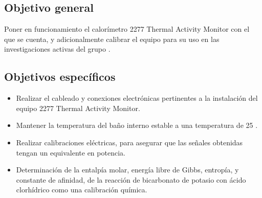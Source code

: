 	\subsection{Objetivo general}
		Poner en funcionamiento el calorímetro 2277 Thermal Activity Monitor con el que se cuenta, y adicionalmente calibrar el equipo para su uso en las investigaciones activas del grupo \groupname.
		
	\subsection{Objetivos específicos}
		\begin{itemize}
			\item Realizar el cableado y conexiones electrónicas pertinentes a la instalaci\'on del equipo 2277 Thermal Activity Monitor.
			\item Mantener la temperatura del ba\~no interno estable a una temperatura de 25 \grad{}.
			\item Realizar calibraciones eléctricas, para asegurar que las señales obtenidas tengan un equivalente en potencia.
			\item Determinación de la entalpía molar, energía libre de Gibbs, entropía, y constante de afinidad, de la reacci\'on de bicarbonato de potasio con \'acido clorh\'idrico como una calibración química.
		\end{itemize}